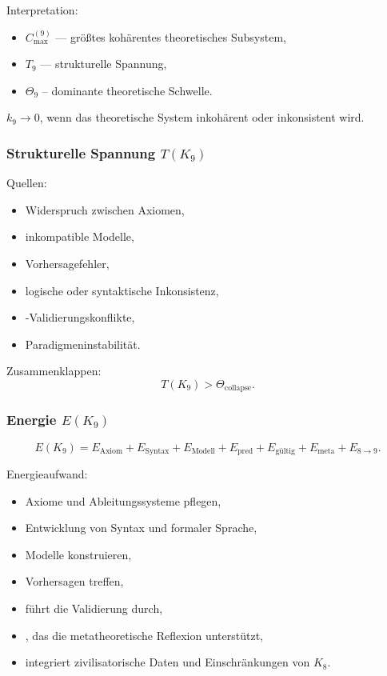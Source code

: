 Interpretation:
\begin{itemize}
    \item $C_{\max}^{(9)}$ — größtes kohärentes theoretisches Subsystem,
    \item $T_9$ — strukturelle Spannung,
    \item $\Theta_9$ – dominante theoretische Schwelle.
\end{itemize}

$k_9 \to 0$, wenn das theoretische System inkohärent oder inkonsistent wird.

\subsubsection{Strukturelle Spannung \texorpdfstring{$T(K_9)$}{T(K_9)}}

Quellen:
\begin{itemize}
    \item Widerspruch zwischen Axiomen,
    \item inkompatible Modelle,
    \item Vorhersagefehler,
    \item logische oder syntaktische Inkonsistenz,
    \item-Validierungskonflikte,
    \item Paradigmeninstabilität.
\end{itemize}

Zusammenklappen:
\[
T(K_9) > \Theta_{\mathrm{collapse}}.
\]

\subsubsection{Energie \texorpdfstring{$E(K_9)$}{E(K_9)}}

\[
E(K_9)=
E_{\mathrm{Axiom}}+
E_{\mathrm{Syntax}}+
E_{\mathrm{Modell}}+
E_{\mathrm{pred}}+
E_{\mathrm{gültig}}+
E_{\mathrm{meta}}+
E_{8\to9}.
\]

Energieaufwand:
\begin{itemize}
    \item Axiome und Ableitungssysteme pflegen,
    \item Entwicklung von Syntax und formaler Sprache,
    \item Modelle konstruieren,
    \item Vorhersagen treffen,
    \item führt die Validierung durch,
    \item, das die metatheoretische Reflexion unterstützt,
    \item integriert zivilisatorische Daten und Einschränkungen von $K_8$.
\end{itemize}

